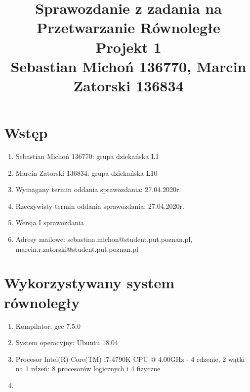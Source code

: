 \documentclass[12pt]{article}
\begin{document}
\title{Sprawozdanie z zadania na Przetwarzanie Równoległe\\
\large Projekt 1\\
\large Sebastian Michoń 136770, Marcin Zatorski 136834}
\date{\vspace{-10ex}}
\maketitle

\section{Wstęp}
\begin {enumerate}
\item Sebastian Michoń 136770: grupa dziekańska L1
\item Marcin Zatorski 136834: grupa dziekańska L10
\item Wymagany termin oddania sprawozdania: 27.04.2020r.
\item Rzeczywisty termin oddania sprawozdania: 27.04.2020r.
\item Wersja I sprawozdania
\item Adresy mailowe: sebastian.michon@student.put.poznan.pl, marcin.r.zatorski@student.put.poznan.pl
\end {enumerate}

\section{Wykorzystywany system równoległy}
\begin {enumerate}
	\item Kompilator: gcc 7.5.0
	\item System operacyjny: Ubuntu 18.04
	\item Procesor Intel(R) Core(TM) i7-4790K CPU @ 4.00GHz - 4 rdzenie, 2 wątki na 1 rdzeń: 8 procesorów logicznych i 4 fizyczne
	\item 
\end {enumerate}
\end{document}
